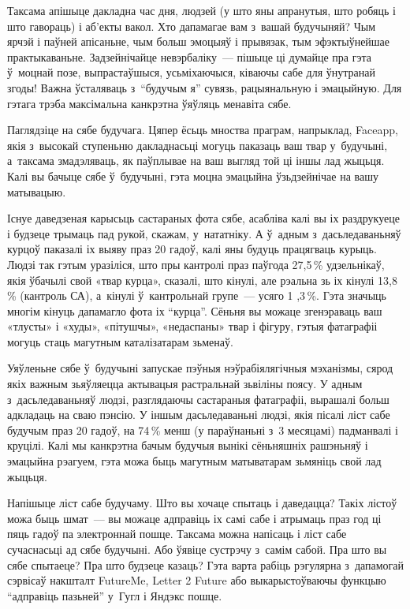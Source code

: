 Таксама апішыце дакладна час дня, людзей (у што яны апранутыя, што робяць і што гавораць) і аб'екты вакол. Хто дапамагае вам з~вашай будучыняй? Чым ярчэй і паўней апісаньне, чым больш эмоцыяў і прывязак, тым эфэктыўнейшае практыкаваньне. Задзейнічайце невэрбаліку~--- пішыце ці думайце пра гэта ў~моцнай позе, выпрастаўшыся, усьміхаючыся, ківаючы сабе для ўнутранай згоды! Важна ўсталяваць з~``будучым я'' сувязь, рацыянальную і эмацыйную. Для гэтага трэба максімальна канкрэтна ўяўляць менавіта сябе.

Паглядзіце на сябе будучага. Цяпер ёсьць мноства праграм, напрыклад, Faceapp, якія з~высокай ступеньню дакладнасьці могуць паказаць ваш твар у~будучыні, а~таксама змадэляваць, як паўплывае на ваш выгляд той ці іншы лад жыцьця. Калі вы бачыце сябе ў~будучыні, гэта моцна эмацыйна ўзьдзейнічае на вашу матывацыю.

Існуе даведзеная карысьць састараных фота сябе, асабліва калі вы іх раздрукуеце і будзеце трымаць пад рукой, скажам, у~нататніку. А ў~адным з~дасьледаваньняў курцоў паказалі іх выяву праз 20 гадоў, калі яны будуць працягваць курыць. Людзі так гэтым уразіліся, што пры кантролі праз паўгода 27,5\,\% удзельнікаў, якія ўбачылі свой «твар курца», сказалі, што кінулі, але рэальна зь іх кінулі 13,8\,\% (кантроль СА), а~кінулі ў~кантрольнай групе~--- усяго 1 ,3\,\%. Гэта значыць многім кінуць дапамагло фота іх ``курца''. Сёньня вы можаце згенэраваць ваш «тлусты» і «худы», «пітушчы», «недаспаны» твар і фігуру, гэтыя фатаграфіі могуць стаць магутным каталізатарам зьменаў.

Уяўленьне сябе ў~будучыні запускае пэўныя нэўрабіялягічныя мэханізмы, сярод якіх важным зьяўляецца актывацыя растральнай зьвіліны поясу. У адным з~дасьледаваньняў людзі, разглядаючы састараныя фатаграфіі, вырашалі больш адкладаць на сваю пэнсію. У іншым дасьледаваньні людзі, якія пісалі ліст сабе будучым праз 20 гадоў, на 74\,\% менш (у параўнаньні з~3 месяцамі) падманвалі і круцілі. Калі мы канкрэтна бачым будучыя вынікі сёньняшніх рашэньняў і эмацыйна рэагуем, гэта можа быць магутным матыватарам зьмяніць свой лад жыцьця. 

Напішыце ліст сабе будучаму. Што вы хочаце спытаць і даведацца? Такіх лістоў можа быць шмат~--- вы можаце адправіць іх самі сабе і атрымаць праз год ці пяць гадоў па электроннай пошце. Таксама можна напісаць і ліст сабе сучаснасьці ад сябе будучыні. Або ўявіце сустрэчу з~самім сабой. Пра што вы сябе спытаеце? Пра што будзеце казаць? Гэта варта рабіць рэгулярна з~дапамогай сэрвісаў накшталт FutureMe, Letter 2 Future або выкарыстоўваючы функцыю ``адправіць пазьней'' у~Гугл і Яндэкс пошце.

